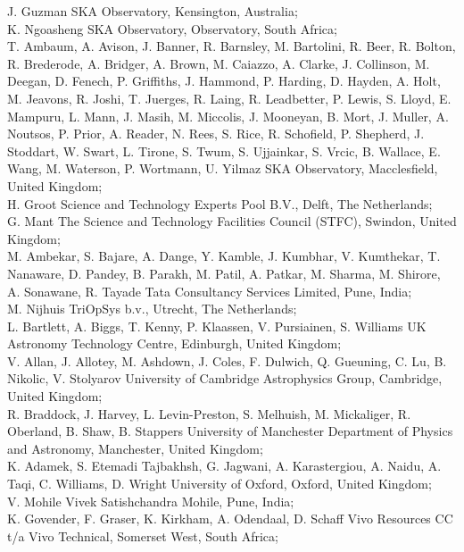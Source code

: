 \documentclass[a4paper,
               biblatex,     %
               keeplastbox,   %
               ]{jacow}
\begin{document}
J. Guzman SKA Observatory, Kensington, Australia;\\
K. Ngoasheng SKA Observatory, Observatory, South Africa;\\
T. Ambaum,
A. Avison,
J. Banner,
R. Barnsley,
M. Bartolini,
R. Beer,
R. Bolton,
R. Brederode,
A. Bridger,
A. Brown,
M. Caiazzo,
A. Clarke,
J. Collinson,
M. Deegan,
D. Fenech,
P. Griffiths,
J. Hammond,
P. Harding,
D. Hayden,
A. Holt,
M. Jeavons,
R. Joshi,
T. Juerges,
R. Laing,
R. Leadbetter,
P. Lewis,
S. Lloyd,
E. Mampuru,
L. Mann,
J. Masih,
M. Miccolis,
J. Mooneyan,
B. Mort,
J. Muller,
A. Noutsos,
P. Prior,
A. Reader,
N. Rees,
S. Rice,
R. Schofield,
P. Shepherd,
J. Stoddart,
W. Swart,
L. Tirone,
S. Twum,
S. Ujjainkar,
S. Vrcic,
B. Wallace,
E. Wang,
M. Waterson,
P. Wortmann,
U. Yilmaz SKA Observatory, Macclesfield, United Kingdom;\\
H. Groot Science and Technology Experts Pool B.V., Delft, The Netherlands;\\
G. Mant The Science and Technology Facilities Council (STFC), Swindon, United Kingdom;\\
M. Ambekar,
S. Bajare,
A. Dange,
Y. Kamble,
J. Kumbhar,
V. Kumthekar,
T. Nanaware,
D. Pandey,
B. Parakh,
M. Patil,
A. Patkar,
M. Sharma,
M. Shirore,
A. Sonawane,
R. Tayade Tata Consultancy Services Limited, Pune, India;\\
M. Nijhuis TriOpSys b.v., Utrecht, The Netherlands;\\
L. Bartlett,
A. Biggs,
T. Kenny,
P. Klaassen,
V. Pursiainen,
S. Williams UK Astronomy Technology Centre, Edinburgh, United Kingdom;\\
V. Allan,
J. Allotey,
M. Ashdown,
J. Coles,
F. Dulwich,
Q. Gueuning,
C. Lu,
B. Nikolic,
V. Stolyarov University of Cambridge Astrophysics Group, Cambridge, United Kingdom;\\
R. Braddock,
J. Harvey,
L. Levin-Preston,
S. Melhuish,
M. Mickaliger,
R. Oberland,
B. Shaw,
B. Stappers University of Manchester Department of Physics and Astronomy, Manchester, United Kingdom;\\
K. Adamek,
S. Etemadi Tajbakhsh,
G. Jagwani,
A. Karastergiou,
A. Naidu,
A. Taqi,
C. Williams,
D. Wright University of Oxford, Oxford, United Kingdom;\\
V. Mohile Vivek Satishchandra Mohile, Pune, India;\\
K. Govender,
F. Graser,
K. Kirkham,
A. Odendaal,
D. Schaff Vivo Resources CC t/a Vivo Technical, Somerset West, South Africa;

\printbibliography
\end{document}
